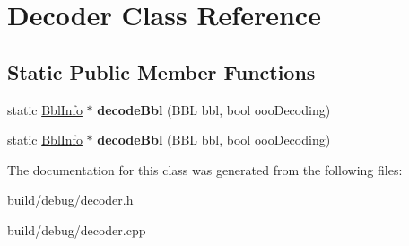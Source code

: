 \hypertarget{classDecoder}{\section{Decoder Class Reference}
\label{classDecoder}
}
\subsection*{Static Public Member Functions}
\begin{DoxyCompactItemize}
\item 
\hypertarget{classDecoder_a42cfea2d7b919c4be5a8406f4a298950}{static \hyperlink{structBblInfo}{Bbl\-Info} $\ast$ {\bfseries decode\-Bbl} (B\-B\-L bbl, bool ooo\-Decoding)}\label{classDecoder_a42cfea2d7b919c4be5a8406f4a298950}

\item 
\hypertarget{classDecoder_af17f24113dda5dee4bae6674048a81f3}{static \hyperlink{structBblInfo}{Bbl\-Info} $\ast$ {\bfseries decode\-Bbl} (B\-B\-L bbl, bool ooo\-Decoding)}\label{classDecoder_af17f24113dda5dee4bae6674048a81f3}

\end{DoxyCompactItemize}


The documentation for this class was generated from the following files\-:\begin{DoxyCompactItemize}
\item 
build/debug/decoder.\-h\item 
build/debug/decoder.\-cpp\end{DoxyCompactItemize}
